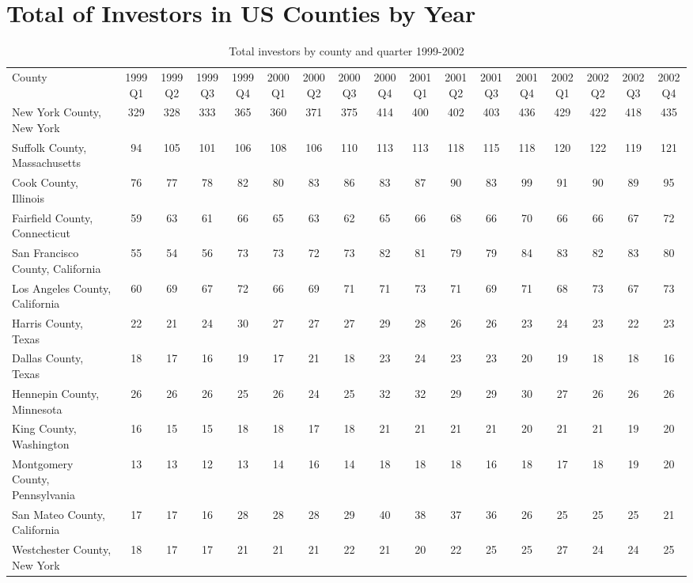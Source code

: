 \chapter{Total of Investors in US Counties by Year}
\label{App:CountiesCount}
   \begin{landscape}
   	  	\tiny 
	\begin{longtable}{lcccccccccccccccc}
	\caption[Total Investors by County and Quarter 1999-2002]{Total investors by county and quarter 1999-2002}
		\setlength{\tabcolsep}{8pt}
County &1999Q1 &1999Q2 &1999Q3 &1999Q4 &2000Q1 &2000Q2 &2000Q3 &2000Q4 &2001Q1 & 2001Q2 &2001Q3 &2001Q4 &2002Q1 &2002Q2 &2002Q3 & 2002Q4 \\
	New York County, New York & 329 & 328 & 333 & 365 & 360 & 371 & 375 & 414 & 400 & 402 & 403 & 436 & 429 & 422 & 418 & 435 \\
	Suffolk County, Massachusetts & 94 & 105 & 101 & 106 & 108 & 106 & 110 & 113 & 113 & 118 & 115 & 118 & 120 & 122 & 119 & 121 \\
	Cook County, Illinois & 76 & 77 & 78 & 82 & 80 & 83 & 86 & 83 & 87 & 90 & 83 & 99 & 91 & 90 & 89 & 95 \\
	Fairfield County, Connecticut & 59 & 63 & 61 & 66 & 65 & 63 & 62 & 65 & 66 & 68 & 66 & 70 & 66 & 66 & 67 & 72 \\
	San Francisco County, California & 55 & 54 & 56 & 73 & 73 & 72 & 73 & 82 & 81 & 79 & 79 & 84 & 83 & 82 & 83 & 80 \\
	Los Angeles County, California & 60 & 69 & 67 & 72 & 66 & 69 & 71 & 71 & 73 & 71 & 69 & 71 & 68 & 73 & 67 & 73 \\
	Harris County, Texas & 22 & 21 & 24 & 30 & 27 & 27 & 27 & 29 & 28 & 26 & 26 & 23 & 24 & 23 & 22 & 23 \\
	Dallas County, Texas & 18 & 17 & 16 & 19 & 17 & 21 & 18 & 23 & 24 & 23 & 23 & 20 & 19 & 18 & 18 & 16 \\
	Hennepin County, Minnesota & 26 & 26 & 26 & 25 & 26 & 24 & 25 & 32 & 32 & 29 & 29 & 30 & 27 & 26 & 26 & 26 \\
	King County, Washington & 16 & 15 & 15 & 18 & 18 & 17 & 18 & 21 & 21 & 21 & 21 & 20 & 21 & 21 & 19 & 20 \\
	Montgomery County, Pennsylvania & 13 & 13 & 12 & 13 & 14 & 16 & 14 & 18 & 18 & 18 & 16 & 18 & 17 & 18 & 19 & 20 \\
	San Mateo County, California & 17 & 17 & 16 & 28 & 28 & 28 & 29 & 40 & 38 & 37 & 36 & 26 & 25 & 25 & 25 & 21 \\
	Westchester County, New York & 18 & 17 & 17 & 21 & 21 & 21 & 22 & 21 & 20 & 22 & 25 & 25 & 27 & 24 & 24 & 25 \\

\end{longtable}
\end{landscape}
